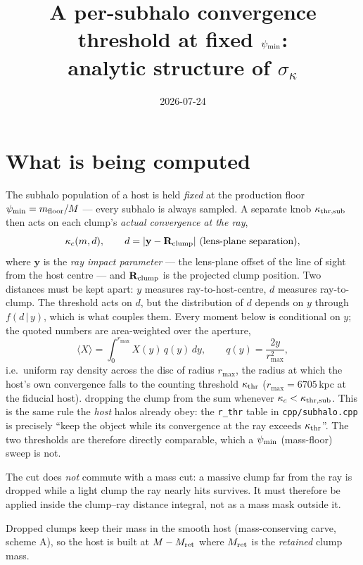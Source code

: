 \documentclass[11pt]{article}
\title{A per-subhalo convergence threshold at fixed $\psi_{\rm min}$:\\
       analytic structure of $\sigma_\kappa$}
\author{}
\date{2026-07-24}
\newcommand{\kthrs}{\kappa_{\rm thr,sub}}
\newcommand{\Mret}{M_{\rm ret}}
\begin{document}
\maketitle

\section{What is being computed}

The subhalo population of a host is held \emph{fixed} at the production floor
$\psi_{\rm min}=m_{\rm floor}/M$ --- every subhalo is always sampled. A separate knob
$\kthrs$ then acts on each clump's \emph{actual convergence at the ray},
\begin{equation}
  \kappa_c(m,d), \qquad d=\lvert \mathbf{y}-\mathbf{R}_{\rm clump}\rvert
  \ \text{(lens-plane separation)},
\end{equation}
where $\mathbf{y}$ is the \emph{ray impact parameter} --- the lens-plane offset of the line
of sight from the host centre --- and $\mathbf{R}_{\rm clump}$ is the projected clump
position. Two distances must be kept apart: $y$ measures ray-to-host-centre, $d$ measures
ray-to-clump. The threshold acts on $d$, but the distribution of $d$ depends on $y$ through
$f(d\,|\,y)$, which is what couples them. Every moment below is conditional on $y$; the
quoted numbers are area-weighted over the aperture,
\begin{equation}
  \langle X\rangle=\int_{0}^{r_{\max}}X(y)\,q(y)\,dy,
  \qquad q(y)=\frac{2y}{r_{\max}^{2}},
\end{equation}
i.e.\ uniform ray density across the disc of radius $r_{\max}$, the radius at which the
host's own convergence falls to the counting threshold $\kappa_{\rm thr}$
($r_{\max}=6705\,$kpc at the fiducial host).
dropping the clump from the sum whenever $\kappa_c<\kthrs$. This is the same rule the
\emph{host} halos already obey: the \texttt{r\_thr} table in \texttt{cpp/subhalo.cpp} is
precisely ``keep the object while its convergence at the ray exceeds $\kappa_{\rm thr}$''.
The two thresholds are therefore directly comparable, which a $\psi_{\rm min}$ (mass-floor)
sweep is not.

The cut does \emph{not} commute with a mass cut: a massive clump far from the ray is
dropped while a light clump the ray nearly hits survives. It must therefore be applied
inside the clump--ray distance integral, not as a mass mask outside it.

Dropped clumps keep their mass in the smooth host (mass-conserving carve, scheme A), so
the host is built at $M-\Mret$ where $\Mret$ is the \emph{retained} clump mass.
\end{document}
